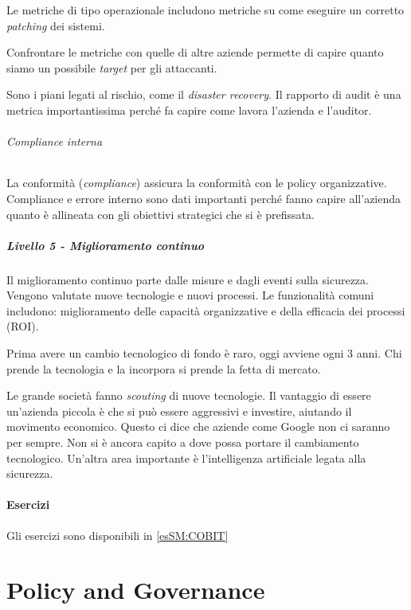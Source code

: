 
Le metriche di tipo operazionale includono metriche su come eseguire 
un corretto \textit{patching} dei sistemi.

Confrontare le metriche con quelle di altre aziende permette di capire quanto 
siamo un possibile \textit{target} per gli attaccanti.


Sono i piani legati al rischio, come il \textit{disaster recovery}.
Il rapporto di audit è una metrica importantissima perché fa capire come lavora 
l'azienda e l'auditor.

\subparagraph{Compliance interna}

La conformità (\textit{compliance}) assicura la conformità con le policy 
organizzative. Compliance e errore interno sono dati importanti perché 
fanno capire all'azienda quanto è allineata con gli obiettivi strategici che si 
è prefissata.


\paragraph{Livello 5 - Miglioramento continuo}

Il miglioramento continuo parte dalle misure e dagli eventi sulla sicurezza.
Vengono valutate nuove tecnologie e nuovi processi. Le funzionalità comuni 
includono: miglioramento delle capacità organizzative e della efficacia dei 
processi (ROI).

Prima avere un cambio tecnologico di fondo è raro, oggi avviene ogni 3 anni. Chi 
prende la tecnologia e la incorpora si prende la fetta di mercato.

Le grande società fanno \textit{scouting} di nuove tecnologie. Il vantaggio di 
essere un'azienda piccola è che si può essere aggressivi e investire, aiutando 
il movimento economico. Questo ci dice che aziende come Google non ci 
saranno per sempre. Non si è ancora capito a dove possa portare il cambiamento
tecnologico. Un'altra area importante è l'intelligenza artificiale legata 
alla sicurezza.


\subsubsection{Esercizi}

Gli esercizi sono disponibili in \ref{esSM:COBIT}

\chapter{Policy and Governance}
\label{PG}

